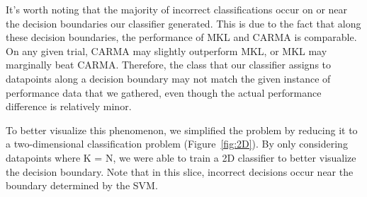 It's worth noting that the majority of incorrect classifications occur on or near the decision boundaries our classifier generated.
This is due to the fact that along these decision boundaries, the performance of MKL and CARMA is comparable.
On any given trial, CARMA may slightly outperform MKL, or MKL may marginally beat CARMA.
Therefore, the class that our classifier assigns to datapoints along a decision boundary may not match the given instance of performance data that we gathered, even though the actual performance difference is relatively minor.

To better visualize this phenomenon, we simplified the problem by reducing it to a two-dimensional classification problem (Figure~\ref{fig:2D}).
By only considering datapoints where K = N, we were able to train a 2D classifier to better visualize the decision boundary.
Note that in this slice, incorrect decisions occur near the boundary determined by the SVM.

